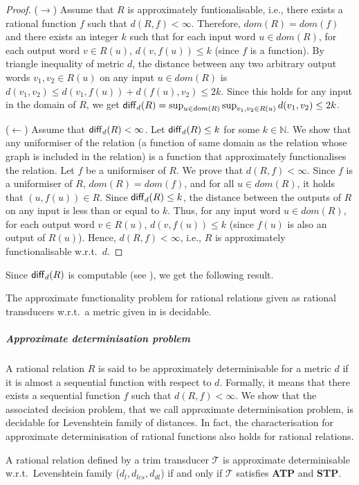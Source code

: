 \documentclass[a4paper,UKenglish,cleveref, autoref, thm-restate,authorcolumns, colorlinks]{lipics-v2021}
\newcommand\dom{\mathit{dom}}
\newcommand\calT{\mathcal{T}}
\newcommand{\ATP}[0]{\textbf{ATP}}
\newcommand{\STP}[0]{\textbf{STP}}
\begin{document}
{\begin{proof}
    
    ($\rightarrow$) Assume that $R$ is approximately funtionalisable, i.e., there exists a rational function $f$ such that $d(R,f) < \infty$. Therefore, $\dom(R) = \dom(f)$ and there exists an integer $k$ such that for each input word $u \in \dom(R)$, for each output word $v \in R(u)$, $d(v, f(u)) \leq k$ (since $f$ is a function). By triangle inequality of metric $d$, the distance between any two arbitrary output words $v_1,v_2 \in R(u)$ on any input $u \in \dom(R)$  is $d(v_1,v_2) \leq d(v_1,f(u)) + d(f(u),v_2) \leq 2k$.  Since this holds for any input in the domain of $R$, we get ${\sf diff}_d(R) = \sup_{u\in dom(R)} \sup_{v_1,v_2\in R(u)} d(v_1,v_2)  \leq 2k$.
    

    ($\leftarrow$) Assume that ${\sf diff}_d(R) < \infty$. Let ${\sf diff}_d(R) \leq k$ for some $k \in \mathbb{N}$. We show that any uniformiser of the relation (a function of same domain as the relation whose graph is included in the relation) is a function that approximately functionalises the relation. 
    Let $f$ be a uniformiser of $R$. We prove that $d(R,f) < \infty$. Since $f$ is a uniformiser of $R$, $\dom(R) = \dom(f)$, and for all $u\in\dom(R)$, it holds that $(u,f(u))\in R$.  Since ${\sf diff}_d(R) \leq k$, the distance between the outputs of $R$ on any input is less than or equal to $k$. Thus, for any input word $u \in \dom(R)$, for each output word $v \in R(u)$, $d(v, f(u)) \leq k$ (since $f(u)$ is also an output of $R(u)$). Hence, $d(R,f) < \infty$, i.e., $R$ is approximately functionalisable w.r.t.~$d$.
\end{proof}

Since ${\sf diff}_d(R)$ is computable (see ), we get the following result.
\begin{theorem}
    The approximate functionality problem for rational relations given as rational transducers w.r.t.~a metric given in  is decidable.
\end{theorem}


\subparagraph*{Approximate determinisation problem}
A rational relation $R$ is said to be approximately determinisable for a metric $d$ if it is almost a sequential function with respect to $d$. Formally, it means that there exists a sequential function $f$ such that $d(R,f)<\infty$. We show that the associated decision problem, that we call approximate determinisation problem, is decidable for Levenshtein family of distances. In fact, the characterisation for approximate determinisation of rational functions also holds for rational relations. 
\begin{lemma}
    A rational relation defined by a trim transducer $\calT$ is approximate determinisable w.r.t.~Levenshtein family ($d_l,d_{lcs},d_{dl}$) if and only if $\calT$ satisfies \ATP{} and \STP{}.
\end{lemma}

}
\end{document}
